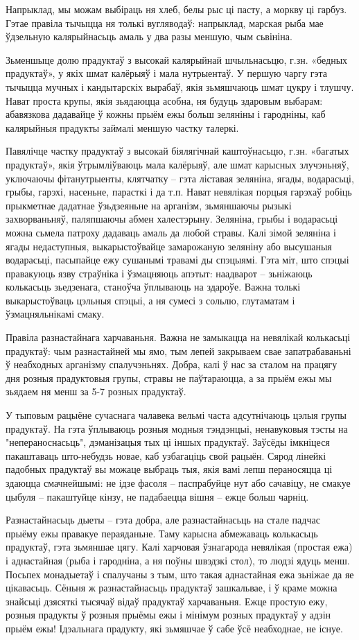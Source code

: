 Напрыклад, мы можам выбіраць ня хлеб, белы рыс ці пасту, а моркву ці гарбуз. Гэтае правіла тычыцца ня толькі вугляводаў: напрыклад, марская рыба мае ўдзельную калярыйнасьць амаль у два разы меншую, чым сьвініна.

Зьменшыце долю прадуктаў з высокай калярыйнай шчыльнасьцю, г.зн. «бедных прадуктаў», у якіх шмат калёрыяў і мала нутрыентаў. У першую чаргу гэта тычыцца мучных і кандытарскіх вырабаў, якія зьмяшчаюць шмат цукру і тлушчу. Нават проста крупы, якія зьядаюцца асобна, ня будуць здаровым выбарам: абавязкова дадавайце ў кожны прыём ежы больш зеляніны і гародніны, каб калярыйныя прадукты займалі меншую частку талеркі.

Павялічце частку прадуктаў з высокай біялягічнай каштоўнасьцю, г.зн. «багатых прадуктаў», якія ўтрымліўваюць мала калёрыяў, але шмат карысных злучэньняў, уключаючы фітанутрыенты, клятчатку – гэта ліставая зеляніна, ягады, водарасьці, грыбы, гарэхі, насеньне, парасткі і да т.п. Нават невялікая порцыя гарэхаў робіць прыкметнае дадатнае ўзьдзеяньне на арганізм, зьмяншаючы рызыкі захворваньняў, паляпшаючы абмен халестэрыну. Зеляніна, грыбы і водарасьці можна сьмела патроху дадаваць амаль да любой стравы. Калі зімой зеляніна і ягады недаступныя, выкарыстоўвайце замарожаную зеляніну або высушаныя водарасьці, пасыпайце ежу сушанымі травамі ды спэцыямі. Гэта міт, што спэцыі правакуюць язву страўніка і ўзмацняюць апэтыт: наадварот – зьніжаюць колькасьць зьедзенага, станоўча ўплываюць на здароўе. Важна толькі выкарыстоўваць цэльныя спэцыі, а ня сумесі з сольлю, глутаматам і ўзмацняльнікамі смаку.

Правіла разнастайнага харчаваньня. Важна не замыкацца на невялікай колькасьці прадуктаў: чым разнастайней мы ямо, тым лепей закрываем свае запатрабаваньні ў неабходных арганізму спалучэньнях. Добра, калі ў нас за сталом на працягу дня розныя прадуктовыя групы, стравы не паўтараюцца, а за прыём ежы мы зьядаем ня менш за 5-7 розных прадуктаў.

У тыповым рацыёне сучаснага чалавека вельмі часта адсутнічаюць цэлыя групы прадуктаў. На гэта ўплываюць розныя модныя тэндэнцыі, ненавуковыя тэсты на "непераноснасьць", дэманізацыя тых ці іншых прадуктаў. Заўсёды імкніцеся пакаштаваць што-небудзь новае, каб узбагаціць свой рацыён. Сярод лінейкі падобных прадуктаў вы можаце выбраць тыя, якія вамі лепш пераносяцца ці здаюцца смачнейшымі: не ідзе фасоля – паспрабуйце нут або сачавіцу, не смакуе цыбуля – пакаштуйце кінзу, не падабаецца вішня – ежце больш чарніц.

Разнастайнасьць дыеты – гэта добра, але разнастайнасьць на стале падчас прыёму ежы правакуе пераяданьне. Таму карысна абмежаваць колькасьць прадуктаў, гэта зьмяншае цягу. Калі харчовая ўзнагарода невялікая (простая ежа) і аднастайная (рыба і гародніна, а ня поўны швэдзкі стол), то людзі ядуць менш. Посьпех монадыетаў і спалучаны з тым, што такая аднастайная ежа зьніжае да яе цікавасьць. Сёньня ж разнастайнасьць прадуктаў зашкальвае, і ў краме можна знайсьці дзясяткі тысячаў відаў прадуктаў харчаваньня. Ежце простую ежу, розныя прадукты ў розныя прыёмы ежы і мінімум розных прадуктаў у адзін прыём ежы! Ідэальнага прадукту, які зьмяшчае ў сабе ўсё неабходнае, не існуе.

